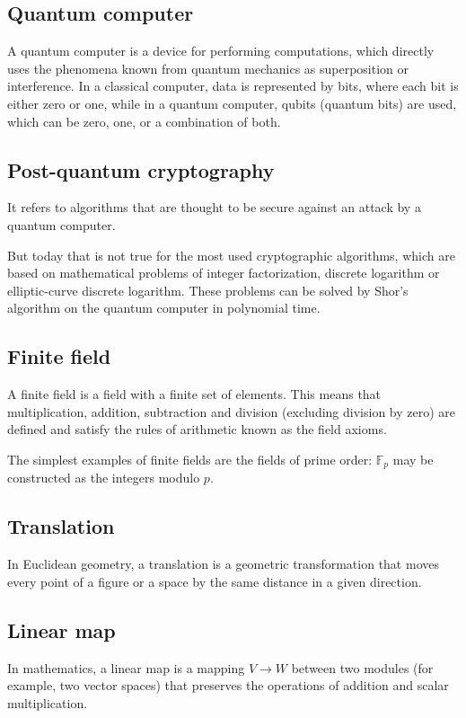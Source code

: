 \documentclass[thesis=M,english]{FITthesis}[2019/12/23]
\begin{document}
\subsection{Quantum computer}
A quantum computer is a device for performing computations, which directly uses the phenomena known from quantum mechanics as superposition or interference. In a classical computer, data is represented by bits, where each bit is either zero or one, while in a quantum computer, qubits (quantum bits) are used, which can be zero, one, or a combination of both.

\subsection{Post-quantum cryptography}
It refers to algorithms that are thought to be secure against an attack by a quantum computer.

But today that is not true for the most used cryptographic algorithms, which are based on mathematical problems of integer factorization, discrete logarithm or elliptic-curve discrete logarithm. These problems can be solved by Shor's algorithm on the quantum computer in polynomial time.

\subsection{Finite field}
A finite field is a field with a finite set of elements. This means that multiplication, addition, subtraction and division (excluding division by zero) are defined and satisfy the rules of arithmetic known as the field axioms.

The simplest examples of finite fields are the fields of prime order: $\mathbb {F}_{p}$ may be constructed as the integers modulo $p$.

\subsection{Translation}
In Euclidean geometry, a translation is a geometric transformation that moves every point of a figure or a space by the same distance in a given direction.

\subsection{Linear map}
In mathematics, a linear map is a mapping $V \rightarrow W$ between two modules (for example, two vector spaces) that preserves the operations of addition and scalar multiplication.
\end{document}
